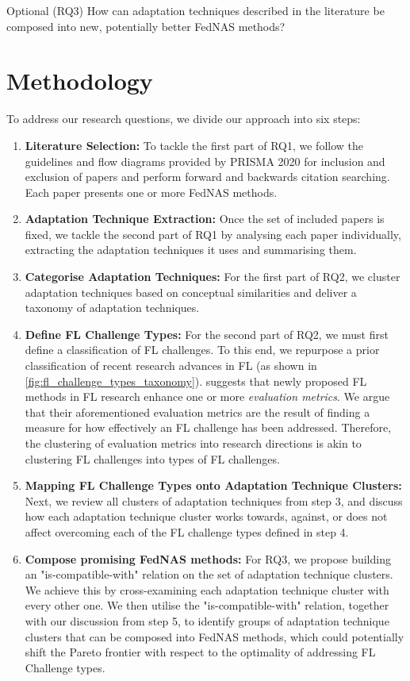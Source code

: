 \vspace{1em}
Optional (RQ3) How can adaptation techniques described in the literature be composed into new, potentially better FedNAS methods?
\vspace{1em}

\section{Methodology}


To address our research questions, we divide our approach into six steps:

\begin{enumerate}
    \item \textbf{Literature Selection:} To tackle the first part of RQ1, we follow the guidelines and flow diagrams provided by PRISMA 2020 \cite{prisma_2020} for inclusion and exclusion of papers and perform forward and backwards citation searching. Each paper presents one or more FedNAS methods. 
    \item \textbf{Adaptation Technique Extraction:} Once the set of included papers is fixed, we tackle the second part of RQ1 by analysing each paper individually, extracting the adaptation techniques it uses and summarising them.
    \item \textbf{Categorise Adaptation Techniques:} For the first part of RQ2, we cluster adaptation techniques based on conceptual similarities and deliver a taxonomy of adaptation techniques.
    \item \textbf{Define FL Challenge Types:} For the second part of RQ2, we must first define a classification of FL challenges. To this end, we repurpose a prior classification \cite{fl_taxonomy_2024} of recent research advances in FL (as shown in \ref{fig:fl_challenge_types_taxonomy}). \cite{fl_taxonomy_2024} suggests that newly proposed FL methods in FL research enhance one or more \textit{evaluation metrics}. We argue that their aforementioned evaluation metrics are the result of finding a measure for how effectively an FL challenge has been addressed. Therefore, the clustering of evaluation metrics into research directions is akin to clustering FL challenges into types of FL challenges.
    \item \textbf{Mapping FL Challenge Types onto Adaptation Technique Clusters:} Next, we review all clusters of adaptation techniques from step 3, and discuss how each adaptation technique cluster works towards, against, or does not affect overcoming each of the FL challenge types defined in step 4.
    \item \textbf{Compose promising FedNAS methods:} For RQ3, we propose building an "is-compatible-with" relation on the set of adaptation technique clusters. We achieve this by cross-examining each adaptation technique cluster with every other one. We then utilise the "is-compatible-with" relation, together with our discussion from step 5, to identify groups of adaptation technique clusters that can be composed into FedNAS methods, which could potentially shift the Pareto frontier with respect to the optimality of addressing FL Challenge types.
\end{enumerate}

